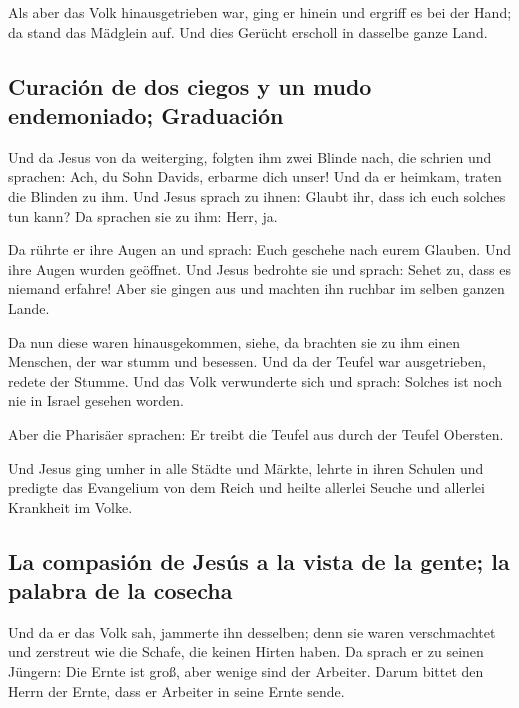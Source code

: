  Als aber das Volk hinausgetrieben war, ging er hinein
und ergriff es bei der Hand; da stand das Mädglein auf. 
Und dies Gerücht erscholl in dasselbe ganze Land.

\hypertarget{curaciuxf3n-de-dos-ciegos-y-un-mudo-endemoniado-graduaciuxf3n}{%
\subsection{Curación de dos ciegos y un mudo endemoniado;
Graduación}\label{curaciuxf3n-de-dos-ciegos-y-un-mudo-endemoniado-graduaciuxf3n}}

 Und da Jesus von da weiterging, folgten ihm zwei Blinde
nach, die schrien und sprachen: Ach, du Sohn Davids, erbarme dich unser!
 Und da er heimkam, traten die Blinden zu ihm. Und Jesus
sprach zu ihnen: Glaubt ihr, dass ich euch solches tun kann? Da sprachen
sie zu ihm: Herr, ja.

 Da rührte er ihre Augen an und sprach: Euch geschehe
nach eurem Glauben.  Und ihre Augen wurden geöffnet. Und
Jesus bedrohte sie und sprach: Sehet zu, dass es niemand erfahre!
 Aber sie gingen aus und machten ihn ruchbar im selben
ganzen Lande.

 Da nun diese waren hinausgekommen, siehe, da brachten
sie zu ihm einen Menschen, der war stumm und besessen. 
Und da der Teufel war ausgetrieben, redete der Stumme. Und das Volk
verwunderte sich und sprach: Solches ist noch nie in Israel gesehen
worden.

 Aber die Pharisäer sprachen: Er treibt die Teufel aus
durch der Teufel Obersten.

 Und Jesus ging umher in alle Städte und Märkte, lehrte
in ihren Schulen und predigte das Evangelium von dem Reich und heilte
allerlei Seuche und allerlei Krankheit im Volke.

\hypertarget{la-compasiuxf3n-de-jesuxfas-a-la-vista-de-la-gente-la-palabra-de-la-cosecha}{%
\subsection{La compasión de Jesús a la vista de la gente; la palabra de
la
cosecha}\label{la-compasiuxf3n-de-jesuxfas-a-la-vista-de-la-gente-la-palabra-de-la-cosecha}}

 Und da er das Volk sah, jammerte ihn desselben; denn sie
waren verschmachtet und zerstreut wie die Schafe, die keinen Hirten
haben.  Da sprach er zu seinen Jüngern: Die Ernte ist
groß, aber wenige sind der Arbeiter.  Darum bittet den
Herrn der Ernte, dass er Arbeiter in seine Ernte sende.


